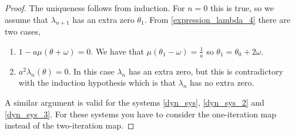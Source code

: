 \documentclass[10pt,a4paper]{amsart}
\begin{document}
\begin{proof}
    The uniqueness follows from induction. For $n=0$ this is true, so we assume that $\lambda_{n+1}$ has an extra zero $\theta_1$. From \eqref{expression_lambda_4} there are two cases,
    \begin{enumerate}
        \item $1 - a\mu(\theta+\omega)=0$.
        We have that $\mu(\theta_1-\omega)=\frac{1}{a}$ so $\theta_1=\theta_0+2\omega$.
        
        \item $a^2\lambda_n(\theta)=0$.
        In this case $\lambda_n$ has an extra zero, but this is contradictory with the induction hypothesis which is that $\lambda_{n}$ has no extra zero.
    \end{enumerate}
    A similar argument is valid for the systems \eqref{dyn_sys}, \eqref{dyn_sys_2} and \eqref{dyn_sys_3}. For these systems you have to consider the one-iteration map instead of the two-iteration map.
\end{proof}
\end{document}

